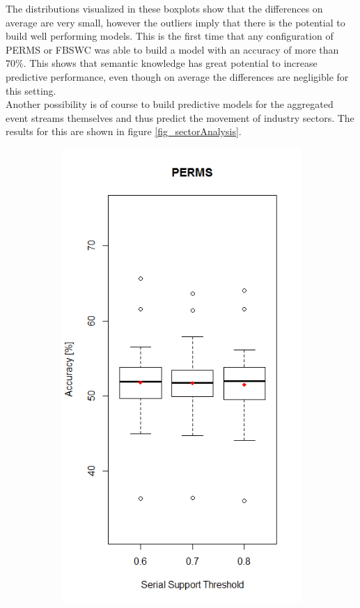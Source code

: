 The distributions visualized in these boxplots show that the differences on average are very small, however the outliers imply that there is the potential to build well performing models. This is the first time that any configuration of PERMS or FBSWC was able to build a model with an accuracy of more than $70\%$. This shows that semantic knowledge has great potential to increase predictive performance, even though on average the differences are negligible for this setting. \\
Another possibility is of course to build predictive models for the aggregated event streams themselves and thus predict the movement of industry sectors. The results for this are shown in figure \ref{fig_sectorAnalysis}.

\begin{figure}
\centering
\begin{subfigure}{.5\textwidth}
  \centering
  \includegraphics[width=\linewidth]{permsSectorPrediction}

\end{subfigure}
\end{figure}
